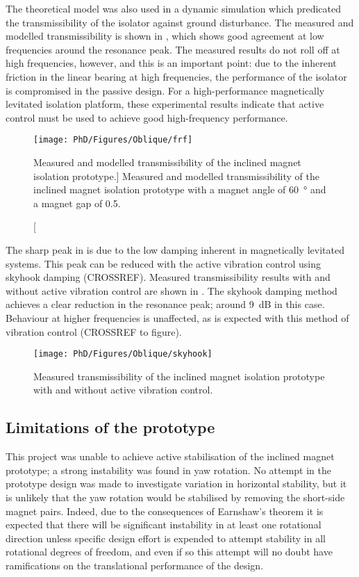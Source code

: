 \documentclass[11pt,a4paper]{memoir}
\begin{document}
The theoretical model was also used in a dynamic simulation which predicated the transmissibility of the isolator against ground disturbance.
The measured and modelled transmissibility is shown in , which shows good agreement at low frequencies around the resonance peak.
The measured results do not roll off at high frequencies, however, and this is an important point: due to the inherent friction in the linear bearing at high frequencies, the performance of the isolator is compromised in the passive design.
For a high-performance magnetically levitated isolation platform, these experimental results indicate that active control must be used to achieve good high-frequency performance.

\begin{figure}
\centering
\texttt{[image: PhD/Figures/Oblique/frf]}
\caption
[Measured and modelled transmissibility of the inclined magnet isolation prototype.]
{Measured and modelled transmissibility of the inclined magnet isolation prototype with a magnet angle of \SI{60}{\degree} and a magnet gap of \num{0.5}.}
\end{figure}

The sharp peak in  is due to the low damping inherent in magnetically levitated systems.
This peak can be reduced with the active vibration control using skyhook damping (CROSSREF).
Measured transmissibility results with and without active vibration control are shown in .
The skyhook damping method achieves a clear reduction in the resonance peak; around \SI{9}{dB} in this case.
Behaviour at higher frequencies is unaffected, as is expected with this method of vibration control (CROSSREF to figure).

\begin{figure}
\centering
\texttt{[image: PhD/Figures/Oblique/skyhook]}
\caption{Measured transmissibility of the inclined magnet isolation prototype with and without active vibration control.}
\end{figure}

\subsection{Limitations of the prototype}

This project was unable to achieve active stabilisation of the inclined magnet prototype; a strong instability was found in yaw rotation.
No attempt in the prototype design was made to investigate variation in horizontal stability, but it is unlikely that the yaw rotation would be stabilised by removing the short-side magnet pairs.
Indeed, due to the consequences of Earnshaw's theorem it is expected that there will be significant instability in at least one rotational direction unless specific design effort is expended to attempt stability in all rotational degrees of freedom, and even if so this attempt will no doubt have ramifications on the translational performance of the design.
\end{document}

